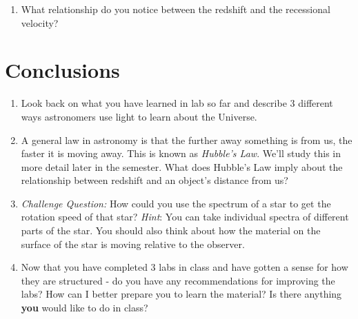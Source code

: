 \documentclass[11pt]{article}
\begin{document}
\begin{enumerate}
    \item What relationship do you notice between the redshift and the recessional velocity?
\end{enumerate}

\section{Conclusions}
\begin{enumerate}
    \item Look back on what you have learned in lab so far and describe 3 different ways astronomers use light to learn about the Universe.
    \item A general law in astronomy is that the further away something is from us, the faster it is moving away. This is known as \textit{Hubble's Law}.  We'll study this in more detail later in the semester.  What does Hubble's Law imply about the relationship between redshift and an object's distance from us?
    \item \textit{Challenge Question:} How could you use the spectrum of a star to get the rotation speed of that star? \textit{Hint}: You can take individual spectra of different parts of the star. You should also think about how the material on the surface of the star is moving relative to the observer.
    \item Now that you have completed 3 labs in class and have gotten a sense for how they are structured - do you have any recommendations for improving the labs?  How can I better prepare you to learn the material?  Is there anything \textbf{you} would like to do in class?
\end{enumerate}
\end{document}
